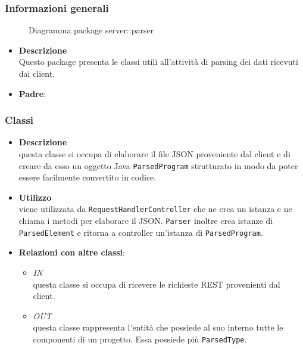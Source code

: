 \subsubsection{Informazioni generali}
\begin{figure}[H]
	\caption{Diagramma package server::parser}
\end{figure}
\begin{itemize}
\item \textbf{Descrizione}\\
Questo package presenta le classi utili all'attività di parsing dei dati ricevuti dai client.
\item \textbf{Padre}: \hyperref[\nogloxy{swedesigner::server}]{}
\end{itemize}
\subsubsection{Classi}
\label{\nogloxy{swedesigner::server::parser::Parser}}
\begin{itemize}
\item \textbf{Descrizione}\\
questa classe si occupa di elaborare il file JSON proveniente dal client e di creare da esso un oggetto Java \texttt{ParsedProgram} strutturato in modo da poter essere facilmente convertito in codice.
\item \textbf{Utilizzo}\\
viene utilizzata da \texttt{RequestHandlerController} che ne crea un istanza e ne chiama i metodi per elaborare il JSON. \texttt{Parser} inoltre crea istanze di \texttt{ParsedElement} e ritorna a controller un'istanza di \texttt{ParsedProgram}.
\item \textbf{Relazioni con altre classi}:
\begin{itemize}
\item \textit{IN} \hyperref[\nogloxy{swedesigner::server::controller::RequestHandlerController}]{}\\
questa classe si occupa di ricevere le richieste REST provenienti dal client.
\item \textit{OUT} \hyperref[\nogloxy{swedesigner::server::project::ParsedProgram}]{}\\
questa classe rappresenta l'entità che possiede al suo interno tutte le componenti di un progetto. Essa possiede più \texttt{ParsedType}.
\end{itemize}
\end{itemize}
